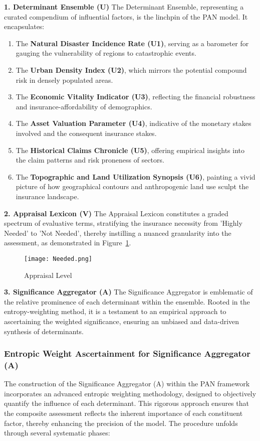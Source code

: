 \documentclass{mcmthesis}
\begin{document}
\textbf{1. Determinant Ensemble (U)}
The Determinant Ensemble, representing a curated compendium of influential factors, is the linchpin of the PAN model. It encapsulates:
\begin{enumerate}
    \item The \textbf{Natural Disaster Incidence Rate (U1)}, serving as a barometer for gauging the vulnerability of regions to catastrophic events.
    \item The \textbf{Urban Density Index (U2)}, which mirrors the potential compound risk in densely populated areas.
    \item The \textbf{Economic Vitality Indicator (U3)}, reflecting the financial robustness and insurance-affordability of demographics.
    \item The \textbf{Asset Valuation Parameter (U4)}, indicative of the monetary stakes involved and the consequent insurance stakes.
    \item The \textbf{Historical Claims Chronicle (U5)}, offering empirical insights into the claim patterns and risk proneness of sectors.
    \item The \textbf{Topographic and Land Utilization Synopsis (U6)}, painting a vivid picture of how geographical contours and anthropogenic land use sculpt the insurance landscape.
\end{enumerate}

\textbf{2. Appraisal Lexicon (V)}
The Appraisal Lexicon constitutes a graded spectrum of evaluative terms, stratifying the insurance necessity from 'Highly Needed' to 'Not Needed', thereby instilling a nuanced granularity into the assessment, as demonstrated in Figure~\ref{fig::Appraisal-Level}.

\begin{figure}[h]
    \centering
    \texttt{[image: Needed.png]}
    \caption{Appraisal Level} \label{fig::Appraisal-Level}
\end{figure}

\textbf{3. Significance Aggregator (A)}
The Significance Aggregator is emblematic of the relative prominence of each determinant within the ensemble. Rooted in the entropy-weighting method, it is a testament to an empirical approach to ascertaining the weighted significance, ensuring an unbiased and data-driven synthesis of determinants.

\subsubsection{Entropic Weight Ascertainment for Significance Aggregator (A)}
The construction of the Significance Aggregator (A) within the PAN framework incorporates an advanced entropic weighting methodology, designed to objectively quantify the influence of each determinant. This rigorous approach ensures that the composite assessment reflects the inherent importance of each constituent factor, thereby enhancing the precision of the model. The procedure unfolds through several systematic phases:
\end{document}
